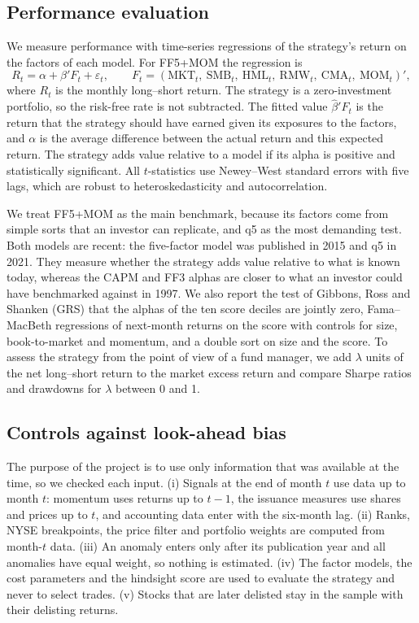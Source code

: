 \documentclass[12pt,a4paper]{article}
\begin{document}
\subsection{Performance evaluation}
We measure performance with time-series regressions of the strategy's return on the factors of each model. For FF5+MOM the regression is
\begin{equation}
R_t=\alpha+\beta'F_t+\varepsilon_t,\qquad F_t=(\text{MKT}_t,\ \text{SMB}_t,\ \text{HML}_t,\ \text{RMW}_t,\ \text{CMA}_t,\ \text{MOM}_t)',
\end{equation}
where $R_t$ is the monthly long--short return. The strategy is a zero-investment portfolio, so the risk-free rate is not subtracted. The fitted value $\hat\beta'F_t$ is the return that the strategy should have earned given its exposures to the factors, and $\alpha$ is the average difference between the actual return and this expected return. The strategy adds value relative to a model if its alpha is positive and statistically significant. All $t$-statistics use Newey--West standard errors with five lags, which are robust to heteroskedasticity and autocorrelation.

We treat FF5+MOM as the main benchmark, because its factors come from simple sorts that an investor can replicate, and q5 as the most demanding test. Both models are recent: the five-factor model was published in 2015 and q5 in 2021. They measure whether the strategy adds value relative to what is known today, whereas the CAPM and FF3 alphas are closer to what an investor could have benchmarked against in 1997. We also report the test of Gibbons, Ross and Shanken (GRS) that the alphas of the ten score deciles are jointly zero, Fama--MacBeth regressions of next-month returns on the score with controls for size, book-to-market and momentum, and a double sort on size and the score. To assess the strategy from the point of view of a fund manager, we add $\lambda$ units of the net long--short return to the market excess return and compare Sharpe ratios and drawdowns for $\lambda$ between 0 and 1.

\subsection{Controls against look-ahead bias}\label{sec:lookahead}
The purpose of the project is to use only information that was available at the time, so we checked each input. (i) Signals at the end of month $t$ use data up to month $t$: momentum uses returns up to $t-1$, the issuance measures use shares and prices up to $t$, and accounting data enter with the six-month lag. (ii) Ranks, NYSE breakpoints, the price filter and portfolio weights are computed from month-$t$ data. (iii) An anomaly enters only after its publication year and all anomalies have equal weight, so nothing is estimated. (iv) The factor models, the cost parameters and the hindsight score are used to evaluate the strategy and never to select trades. (v) Stocks that are later delisted stay in the sample with their delisting returns.
\end{document}
